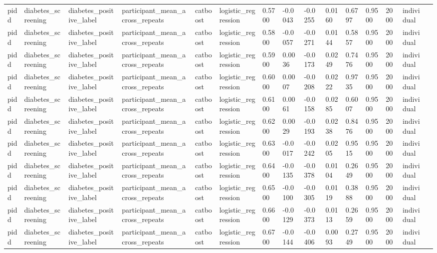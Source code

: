 \begin{tabular}{lllllllllllllll}
pidd & diabetes\_screening & diabetes\_positive\_label & participant\_mean\_across\_repeats & catboost & logistic\_regression & 0.5700 & -0.0043 & -0.0255 & 0.0160 & 0.6797 & 0.9500 & 2000 & individual &  \\
pidd & diabetes\_screening & diabetes\_positive\_label & participant\_mean\_across\_repeats & catboost & logistic\_regression & 0.5800 & -0.0057 & -0.0271 & 0.0144 & 0.5857 & 0.9500 & 2000 & individual &  \\
pidd & diabetes\_screening & diabetes\_positive\_label & participant\_mean\_across\_repeats & catboost & logistic\_regression & 0.5900 & 0.0036 & -0.0173 & 0.0249 & 0.7476 & 0.9500 & 2000 & individual &  \\
pidd & diabetes\_screening & diabetes\_positive\_label & participant\_mean\_across\_repeats & catboost & logistic\_regression & 0.6000 & 0.0007 & -0.0208 & 0.0222 & 0.9735 & 0.9500 & 2000 & individual &  \\
pidd & diabetes\_screening & diabetes\_positive\_label & participant\_mean\_across\_repeats & catboost & logistic\_regression & 0.6100 & 0.0061 & -0.0158 & 0.0285 & 0.6007 & 0.9500 & 2000 & individual &  \\
pidd & diabetes\_screening & diabetes\_positive\_label & participant\_mean\_across\_repeats & catboost & logistic\_regression & 0.6200 & 0.0029 & -0.0193 & 0.0238 & 0.8476 & 0.9500 & 2000 & individual &  \\
pidd & diabetes\_screening & diabetes\_positive\_label & participant\_mean\_across\_repeats & catboost & logistic\_regression & 0.6300 & -0.0017 & -0.0242 & 0.0205 & 0.9515 & 0.9500 & 2000 & individual &  \\
pidd & diabetes\_screening & diabetes\_positive\_label & participant\_mean\_across\_repeats & catboost & logistic\_regression & 0.6400 & -0.0135 & -0.0378 & 0.0104 & 0.2649 & 0.9500 & 2000 & individual &  \\
pidd & diabetes\_screening & diabetes\_positive\_label & participant\_mean\_across\_repeats & catboost & logistic\_regression & 0.6500 & -0.0100 & -0.0305 & 0.0119 & 0.3888 & 0.9500 & 2000 & individual &  \\
pidd & diabetes\_screening & diabetes\_positive\_label & participant\_mean\_across\_repeats & catboost & logistic\_regression & 0.6600 & -0.0129 & -0.0373 & 0.0113 & 0.2659 & 0.9500 & 2000 & individual &  \\
pidd & diabetes\_screening & diabetes\_positive\_label & participant\_mean\_across\_repeats & catboost & logistic\_regression & 0.6700 & -0.0144 & -0.0406 & 0.0093 & 0.2749 & 0.9500 & 2000 & individual &  \\

\end{tabular}
